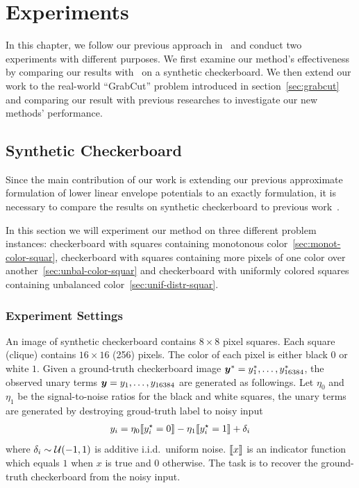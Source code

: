 
\chapter{Experiments}
\label{cha:Experiments}

In this chapter, we follow our previous approach
in~\cite{gouldlearning} and conduct two experiments with
different purposes. We first examine our method's effectiveness
by comparing our results with~\cite{gouldlearning,Gould:ICML2011}
on a synthetic checkerboard. We then extend our work to the
real-world ``GrabCut'' problem introduced in
section~\ref{sec:grabcut} and comparing our result with previous
researches \cite{Rother:SIGGRAPH04} to investigate
our new methods' performance.

\section{Synthetic Checkerboard}
\label{sec:synth-check}

Since the main contribution of our work is extending our previous
approximate formulation of lower linear envelope potentials to an
exactly formulation, it is necessary to compare the results on
synthetic checkerboard to previous work~\cite{gouldlearning}.

In this section we will experiment our method on three different
problem instances: checkerboard with squares containing
monotonous color~\ref{sec:monot-color-squar}, checkerboard with
squares containing more pixels of one color over
another~\ref{sec:unbal-color-squar} and checkerboard with
uniformly colored squares containing unbalanced
color~\ref{sec:unif-distr-squar}.

\subsection{Experiment Settings}
\label{sec:experiment-settings}

An image of synthetic checkerboard contains $8 \times 8$ pixel
squares. Each square (clique) contains $16 \times 16$ (256)
pixels. The color of each pixel is either black $0$ or white $1$.
Given a ground-truth checkerboard image
${\boldsymbol{y}}^*=y^*_1,\dots,y^*_{16384}$, the observed unary terms
${\boldsymbol{y}}=y_1,\dots,y_{16384}$ are generated as followings. Let
$\eta_0$ and $\eta_1$ be the signal-to-noise ratios for the black
and white squares, the unary terms are generated by destroying
groud-truth label to noisy input
\begin{align}
  \label{eq:noisy_checkerboard}
  y_i = \eta_0 \ind{y^\star_i = 0} - \eta_1 \ind{y^\star_i = 1} + \delta_i
\end{align}
where $\delta_i
\sim {\cal U}(-1, 1)$ is additive i.i.d.\ uniform noise. $\ind{x}$ is
an indicator function which equals $1$ when $x$ is true and $0$
otherwise. The task is to recover the ground-truth checkerboard
from the noisy input.

